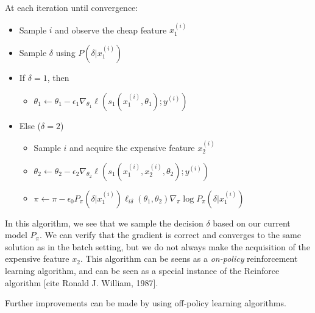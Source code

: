 \documentclass{article}
\newcommand{\x}{x}
\newcommand{\proba}{P}
\newcommand{\loss}{\ell}
\begin{document}
At each iteration until convergence:
\begin{itemize}
  \item Sample $i$ and observe the cheap feature $x_1^{(i)}$
  \item Sample $\delta$ using $\proba(\delta | x_1^{(i)})$
  \item If $\delta=1$, then
  \begin{itemize}
    \item $\theta_1 \leftarrow \theta_1 - \epsilon_1 \nabla_{\theta_1}\loss(s_1(x_1^{(i)},\theta_1);y^{(i)})$
  \end{itemize}
\item Else ($\delta=2$)
	\begin{itemize}
	  \item Sample $i$ and acquire the expensive feature $x_2^{(i)}$	
	  \item $\theta_2 \leftarrow \theta_2 - \epsilon_2 \nabla_{\theta_2} \loss(s_1(x_1^{(i)},x_2^{(i)},\theta_2);y^{(i)})$
      \item $\pi \leftarrow \pi - \epsilon_0  \proba_\pi(\delta |  x_1^{(i)}) \loss_{i\delta}(\theta_1,\theta_2) \nabla_\pi \log \proba_\pi(\delta |  x_1^{(i)})$
	\end{itemize}	
\end{itemize}


In this algorithm, we see that we sample the decision $\delta$ based on our current model $\proba_\pi$. 
We can verify that the gradient is correct and converges to the same solution as in the batch setting, but we do not always make the acquisition of the expensive feature $\x_2$. This algorithm can be seens as a \emph{on-policy} 
reinforcement learning algorithm, and can be seen as a special instance of the Reinforce algorithm [cite Ronald J. William, 1987]. 

Further improvements can be made by using off-policy learning algorithms.
\end{document}
